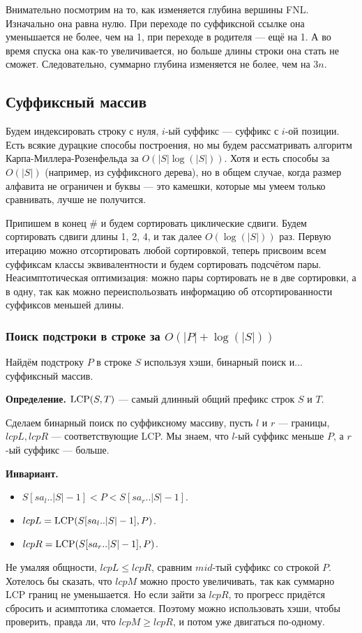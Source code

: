 Внимательно посмотрим на то, как изменяется глубина вершины FNL.
Изначально она равна нулю.
При переходе по суффиксной ссылке она уменьшается не более, чем на 1, при переходе в родителя --- ещё на 1.
А во время спуска она как-то увеличивается, но больше длины строки она стать не сможет.
Следовательно, суммарно глубина изменяется не более, чем на $3n$.

\subsection{Суффиксный массив}
Будем индексировать строку с нуля, $i$-ый суффикс --- суффикс с $i$-ой позиции.
Есть всякие дурацкие способы построения, но мы будем рассматривать алгоритм Карпа-Миллера-Розенфельда за $O(|S| \log(|S|))$.
Хотя и есть способы за $O(|S|)$ (например, из суффиксного дерева), но в общем случае, когда размер алфавита не ограничен и буквы --- это камешки, которые мы умеем только сравнивать, лучше не получится.

Припишем в конец $\#$ и будем сортировать циклические сдвиги.
Будем сортировать сдвиги длины 1, 2, 4, и так далее $O(\log(|S|))$ раз.
Первую итерацию можно отсортировать любой сортировкой, теперь присвоим всем суффиксам классы эквивалентности и будем сортировать подсчётом пары.
Неасимптотическая оптимизация: можно пары сортировать не в две сортировки, а в одну, так как можно переиспольозвать информацию об отсортированности суффиксов меньшей длины.

\subsubsection{Поиск подстроки в строке за $O(|P| + \log(|S|))$}
Найдём подстроку $P$ в строке $S$ используя хэши, бинарный поиск и... суффиксный массив.

\textbf{Определение.} $\operatorname{LCP}(S, T)$ --- самый длинный общий префикс строк $S$ и $T$.

Сделаем бинарный поиск по суффиксному массиву, пусть $l$ и $r$ --- границы, $lcpL, lcpR$ --- соответствующие LCP.
Мы знаем, что $l$-ый суффикс меньше $P$, а $r$-ый суффикс --- больше.

\textbf{Инвариант.} 
\begin{itemize}
    \item $S[sa_l..|S|-1] < P < S[sa_r..|S|-1]$.
    \item $lcpL = \operatorname{LCP}(S[sa_l..|S|-1], P)$.
    \item $lcpR = \operatorname{LCP}(S[sa_r..|S|-1], P)$.
\end{itemize}
Не умаляя общности, $lcpL \le lcpR$, сравним $mid$-тый суффикс со строкой $P$.
Хотелось бы сказать, что $lcpM$ можно просто увеличивать, так как суммарно LCP границ не уменьшается.
Но если зайти за $lcpR$, то прогресс придётся сбросить и асимптотика сломается.
Поэтому можно использовать хэши, чтобы проверить, правда ли, что $lcpM \ge lcpR$, и потом уже двигаться по-одному.

